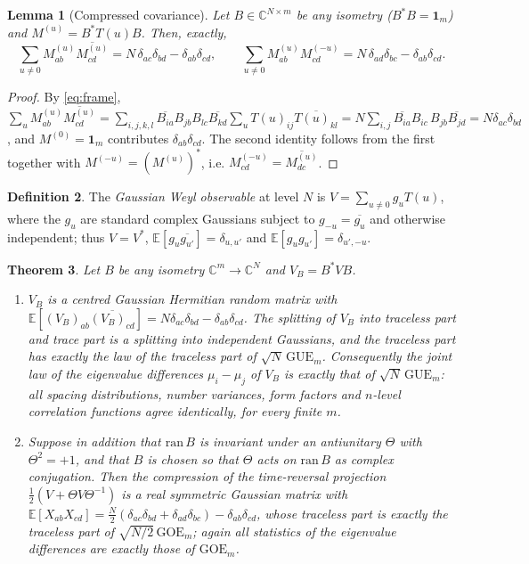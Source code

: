 \documentclass[11pt,reqno]{amsart}
\newtheorem{theorem}{Theorem}[section]
\newtheorem{lemma}[theorem]{Lemma}
\theoremstyle{definition}
\newtheorem{definition}[theorem]{Definition}
\newcommand{\CC}{\mathbb{C}}
\newcommand{\GUE}{\mathrm{GUE}}
\newcommand{\GOE}{\mathrm{GOE}}
\begin{document}
\begin{lemma}[Compressed covariance]\label{lem:cov}
Let $B\in\CC^{N\times m}$ be any isometry ($B^*B=\mathbf 1_m$) and
$M^{(u)}=B^*T(u)B$. Then, exactly,
\begin{equation}\label{eq:cov}
  \sum_{u\neq0}M^{(u)}_{ab}\overline{M^{(u)}_{cd}}
   = N\,\delta_{ac}\delta_{bd}-\delta_{ab}\delta_{cd},
  \qquad
  \sum_{u\neq0}M^{(u)}_{ab}M^{(-u)}_{cd}
   = N\,\delta_{ad}\delta_{bc}-\delta_{ab}\delta_{cd}.
\end{equation}
\end{lemma}

\begin{proof}
By \eqref{eq:frame},
$\sum_{u}M^{(u)}_{ab}\overline{M^{(u)}_{cd}}
=\sum_{i,j,k,l}\overline{B_{ia}}B_{jb}B_{lc}\overline{B_{kd}}
\sum_uT(u)_{ij}\overline{T(u)_{kl}}
=N\sum_{i,j}\overline{B_{ia}}B_{ic}\,B_{jb}\overline{B_{jd}}
=N\delta_{ac}\delta_{bd}$,
and $M^{(0)}=\mathbf 1_m$ contributes $\delta_{ab}\delta_{cd}$. The second
identity follows from the first together with $M^{(-u)}=(M^{(u)})^*$, i.e.
$M^{(-u)}_{cd}=\overline{M^{(u)}_{dc}}$.
\end{proof}

\begin{definition}
The \emph{Gaussian Weyl observable} at level $N$ is $V=\sum_{u\neq0}g_uT(u)$,
where the $g_u$ are standard complex Gaussians subject to
$g_{-u}=\overline{g_u}$ and otherwise independent; thus $V=V^*$,
$\mathbb E[g_u\overline{g_{u'}}]=\delta_{u,u'}$ and
$\mathbb E[g_ug_{u'}]=\delta_{u',-u}$.
\end{definition}

\begin{theorem}\label{thm:A}
Let $B$ be any isometry $\CC^m\to\CC^N$ and $V_B=B^*VB$.
\begin{enumerate}
\item[(a)] $V_B$ is a centred Gaussian Hermitian random matrix with
  $\mathbb E[(V_B)_{ab}\overline{(V_B)_{cd}}]
   =N\delta_{ac}\delta_{bd}-\delta_{ab}\delta_{cd}$. The splitting of $V_B$ into
  traceless part and trace part is a splitting into independent Gaussians, and
  the traceless part has exactly the law of the traceless part of
  $\sqrt N\,\GUE_m$. Consequently the joint law of the eigenvalue differences
  $\mu_i-\mu_j$ of $V_B$ is \emph{exactly} that of $\sqrt N\,\GUE_m$: all spacing
  distributions, number variances, form factors and $n$-level correlation
  functions agree identically, for every finite $m$.
\item[(b)] Suppose in addition that $\mathrm{ran}\,B$ is invariant under an
  antiunitary $\Theta$ with $\Theta^2=+1$, and that $B$ is chosen so that
  $\Theta$ acts on $\mathrm{ran}\,B$ as complex conjugation. Then the
  compression of the time-reversal projection
  $\tfrac12(V+\Theta V\Theta^{-1})$ is a real symmetric Gaussian matrix with
  $\mathbb E[X_{ab}X_{cd}]=\tfrac N2(\delta_{ac}\delta_{bd}
  +\delta_{ad}\delta_{bc})-\delta_{ab}\delta_{cd}$, whose traceless part is
  exactly the traceless part of $\sqrt{N/2}\,\GOE_m$; again all statistics of
  the eigenvalue differences are exactly those of $\GOE_m$.
\end{enumerate}
\end{theorem}
\end{document}
